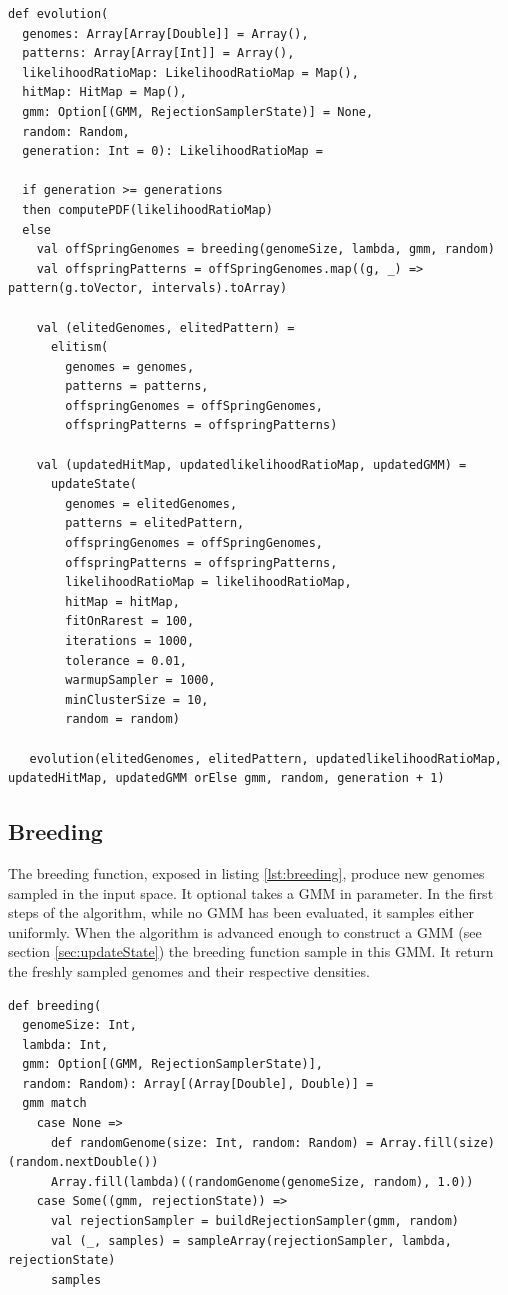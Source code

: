 \documentclass[10pt,letterpaper]{article}
\theoremstyle{definition}
\theoremstyle{remark}
\begin{document}
\begin{lstlisting}[caption={Evolution Loop},label={lst:loop}]
def evolution(
  genomes: Array[Array[Double]] = Array(),
  patterns: Array[Array[Int]] = Array(),
  likelihoodRatioMap: LikelihoodRatioMap = Map(),
  hitMap: HitMap = Map(),
  gmm: Option[(GMM, RejectionSamplerState)] = None,
  random: Random,
  generation: Int = 0): LikelihoodRatioMap =

  if generation >= generations
  then computePDF(likelihoodRatioMap)
  else
    val offSpringGenomes = breeding(genomeSize, lambda, gmm, random)
    val offspringPatterns = offSpringGenomes.map((g, _) => pattern(g.toVector, intervals).toArray)

    val (elitedGenomes, elitedPattern) =
      elitism(
        genomes = genomes, 
        patterns = patterns, 
        offspringGenomes = offSpringGenomes, 
        offspringPatterns = offspringPatterns)

    val (updatedHitMap, updatedlikelihoodRatioMap, updatedGMM) =
      updateState(
        genomes = elitedGenomes,
        patterns = elitedPattern,
        offspringGenomes = offSpringGenomes,
        offspringPatterns = offspringPatterns,
        likelihoodRatioMap = likelihoodRatioMap,
        hitMap = hitMap,
        fitOnRarest = 100,
        iterations = 1000,
        tolerance = 0.01,
        warmupSampler = 1000,
        minClusterSize = 10,
        random = random)

   evolution(elitedGenomes, elitedPattern, updatedlikelihoodRatioMap, updatedHitMap, updatedGMM orElse gmm, random, generation + 1)
\end{lstlisting}


\subsection*{Breeding}

The breeding function, exposed in listing \ref{lst:breeding}, produce new genomes sampled in the input space. It optional takes a GMM in parameter. In the first steps of the algorithm, while no GMM has been evaluated, it samples either uniformly. When the algorithm is advanced enough to construct a GMM (see section \ref{sec:updateState}) the breeding function sample in this GMM. It return the freshly sampled genomes and their respective densities. 

\begin{lstlisting}[caption={Breeding},label={lst:breeding}]
def breeding(
  genomeSize: Int,
  lambda: Int,
  gmm: Option[(GMM, RejectionSamplerState)],
  random: Random): Array[(Array[Double], Double)] =
  gmm match
    case None =>
      def randomGenome(size: Int, random: Random) = Array.fill(size)(random.nextDouble())
      Array.fill(lambda)((randomGenome(genomeSize, random), 1.0))
    case Some((gmm, rejectionState)) =>
      val rejectionSampler = buildRejectionSampler(gmm, random)
      val (_, samples) = sampleArray(rejectionSampler, lambda, rejectionState)
      samples
\end{lstlisting}
\end{document}
